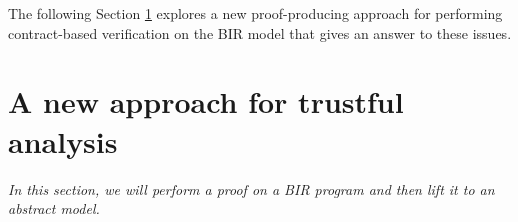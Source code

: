 \documentclass[10pt,a4paper]{article}
\begin{document}
\begin{multicols}{2}
The following Section \ref{trustful-nic-analysis} explores a new proof-producing approach for performing contract-based verification on the BIR model that gives an answer to these issues.







































\section{A new approach for trustful analysis} \label{trustful-nic-analysis}
\textit{In this section, we will perform a proof on a BIR program and then lift it to an abstract model.}
\medskip


\end{multicols}
\end{document}
